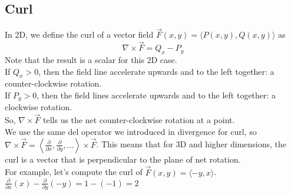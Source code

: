 \subsection{Curl}
\noindent
In 2D, we define the curl of a vector field $\vec{F}(x,y) = \langle P(x,y), Q(x,y) \rangle$ as
\begin{equation*}
	\nabla \times \vec{F} = Q_x - P_y
\end{equation*}
Note that the result is a scalar for this 2D case.\\
If $Q_x > 0$, then the field line accelerate upwards and to the left together: a counter-clockwise rotation.\\
If $P_y > 0$, then the field lines accelerate upwards and to the left together: a clockwise rotation.\\
So, $\nabla \times \vec{F}$ tells us the net counter-clockwise rotation at a point.\\

\noindent
We use the same del operator we introduced in divergence for curl, so $\nabla \times \vec{F} = \left< \frac{\partial}{\partial x}, \frac{\partial}{\partial y},\ldots \right> \times \vec{F}$. This means that for 3D and higher dimensions, the curl is a vector that is perpendicular to the plane of net rotation.\\

\noindent
For example, let's compute the curl of $\vec{F}(x,y) = \langle -y, x \rangle$.\\
\indent
$\frac{\partial}{\partial x}(x) - \frac{\partial}{\partial y}(-y) = 1-(-1) = 2$\\


